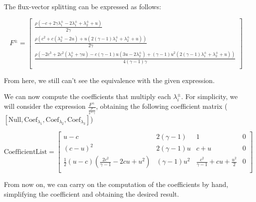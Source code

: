The flux-vector splitting can be expressed as follows:

\begin{equation}
    F^\pm = \begin{bmatrix}
        \frac{\rho  (-c+2 \gamma  \lambda_1^\pm-2 \lambda_1^\pm+\lambda_2^\pm+u)}{2 \gamma }                                                                                                        \\
        \frac{\rho  \left(c^2+c (\lambda_2^\pm-2 u)+u (2 (\gamma -1) \lambda_1^\pm+\lambda_2^\pm+u)\right)}{2 \gamma }                                                                              \\
        \frac{\rho  \left(-2 c^3+2 c^2 (\lambda_2^\pm+\gamma  u)-c (\gamma -1) u (3 u-2 \lambda_2^\pm)+(\gamma -1) u^2 (2 (\gamma -1) \lambda_1^\pm+\lambda_2^\pm+u)\right)}{4 (\gamma -1) \gamma } \\
    \end{bmatrix}
\end{equation}

From here, we still can't see the equivalence with the given expression.

We can now compute the coefficients that multiply each $\lambda_i^\pm$.
For simplicity, we will consider the expression $\frac{F^\pm}{\frac{\rho}{2*\gamma}}$, obtaining the following coefficient matrix ($[\text{Null}, \text{Coef}_{\lambda_1}, \text{Coef}_{\lambda_2}, \text{Coef}_{\lambda_3}]$)

\begin{equation}
    \text{CoefficientList} = \begin{bmatrix}
        u-c                                                   & 2 (\gamma -1)    & 1                                           & 0 \\
        (c-u)^2                                               & 2 (\gamma - 1) u & c+u                                         & 0 \\
        \frac{1}{2} (u-c) (\frac{2 c^2}{\gamma -1}-2 c u+u^2) & (\gamma -1) u^2  & \frac{c^2}{\gamma -1} + c u + \frac{u^2}{2} & 0 \\
    \end{bmatrix}
\end{equation}

From now on, we can carry on the computation of the coefficients by hand, simplifying the coefficient and obtaining the desired result.

